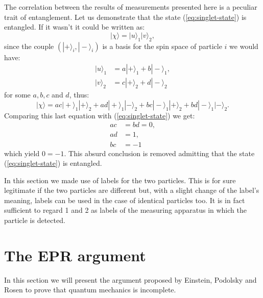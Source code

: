 \begin{observation}
  The correlation between the results of measurements presented here is a peculiar trait of entanglement. Let us demonstrate that the state (\ref{eq:singlet-state}) is entangled. If it wasn't it could be written as:
\begin{equation*}
  |\chi\rangle = |u\rangle_1 |v\rangle_2,
\end{equation*}
since the couple $\left(|+\rangle_i, |-\rangle_i\right)$ is a basis for the spin space of particle $i$ we would have:
\begin{equation*}
  \begin{split}
    |u\rangle_1 &= a |+\rangle_1 + b |-\rangle_1,\\
    |v\rangle_2 &= c |+\rangle_2 + d |-\rangle_2
  \end{split}
\end{equation*}
for some $a, b, c$ and $d$, thus:
\begin{equation*}
  |\chi\rangle = a c |+\rangle_1 |+\rangle_2 + a d |+\rangle_1 |-\rangle_2 + b c |-\rangle_1 |+\rangle_2 + b d |-\rangle_1 |-\rangle_2.
\end{equation*}
Comparing this last equation with (\ref{eq:singlet-state}) we get:
\begin{equation*}
  \begin{split}
    a c &= b d = 0,\\
    a d &= 1,\\
    b c &= - 1
  \end{split}
\end{equation*}
which yield $0 = -1$. This absurd conclusion is removed admitting that the state (\ref{eq:singlet-state}) is entangled.
\end{observation}

\begin{observation}
  In this section we made use of labels for the two particles. This is for sure legitimate if the two particles are different but, with a slight change of the label's meaning, labels can be used in the case of identical particles too. It is in fact sufficient to regard 1 and 2 as labels of the measuring apparatus in which the particle is detected.%
\end{observation}


\section{The EPR argument}
\label{epr-argument}
In this section we will present the argument proposed by Einstein, Podolsky and Rosen \cite{PhysRev.47.777} to prove that quantum mechanics is incomplete.

